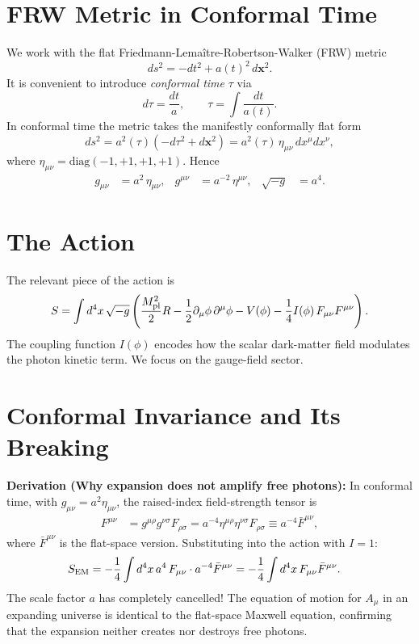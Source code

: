 \documentclass[12pt,a4paper,openany]{book}
\newcommand{\Fmn}{F_{\mu\nu}}
\newcommand{\Mpl}{M_{\rm pl}}
\begin{document}
\section{FRW Metric in Conformal Time}

We work with the flat Friedmann-Lema\^itre-Robertson-Walker (FRW) metric
\begin{equation}
  ds^2 = -dt^2 + a(t)^2\,d\mathbf{x}^2.
\end{equation}
It is convenient to introduce \emph{conformal time} $\tau$ via
\begin{equation}
  d\tau = \frac{dt}{a}, \qquad \tau = \int \frac{dt}{a(t)}.
\end{equation}
In conformal time the metric takes the manifestly conformally flat form
\begin{equation}
  ds^2 = a^2(\tau)\left(-d\tau^2 + d\mathbf{x}^2\right) = a^2(\tau)\,\eta_{\mu\nu}\,dx^\mu dx^\nu,
\end{equation}
where $\eta_{\mu\nu} = \mathrm{diag}(-1,+1,+1,+1)$. Hence
\begin{align}
  g_{\mu\nu} &= a^2\,\eta_{\mu\nu}, & g^{\mu\nu} &= a^{-2}\,\eta^{\mu\nu}, & \sqrt{-g} &= a^4.
\end{align}

\section{The Action}

The relevant piece of the action is
\begin{equation}
  S = \int d^4x\,\sqrt{-g}\left(\frac{\Mpl^2}{2}R - \frac{1}{2}\partial_\mu\phi\,\partial^\mu\phi - V(\phi) - \frac{1}{4}I(\phi)\,\Fmn F^{\mu\nu}\right).
  \label{eq:action}
\end{equation}
The coupling function $I(\phi)$ encodes how the scalar dark-matter field modulates the photon kinetic term. We focus on the gauge-field sector.

\section{Conformal Invariance and Its Breaking}

\noindent\textbf{Derivation (Why expansion does not amplify free photons):} In conformal time, with $g_{\mu\nu} = a^2\eta_{\mu\nu}$, the raised-index field-strength tensor is
\begin{align}
  F^{\mu\nu} &= g^{\mu\rho}g^{\nu\sigma}F_{\rho\sigma} = a^{-4}\eta^{\mu\rho}\eta^{\nu\sigma}F_{\rho\sigma} \equiv a^{-4}\bar{F}^{\mu\nu},
\end{align}
where $\bar{F}^{\mu\nu}$ is the flat-space version. Substituting into the action with $I=1$:
\begin{align}
  S_{\rm EM} &= -\frac{1}{4}\int d^4x\,a^4\,F_{\mu\nu}\cdot a^{-4}\bar{F}^{\mu\nu} = -\frac{1}{4}\int d^4x\,F_{\mu\nu}\bar{F}^{\mu\nu}.
\end{align}
The scale factor $a$ has completely cancelled! The equation of motion for $A_\mu$ in an expanding universe is identical to the flat-space Maxwell equation, confirming that the expansion neither creates nor destroys free photons.
\end{document}
